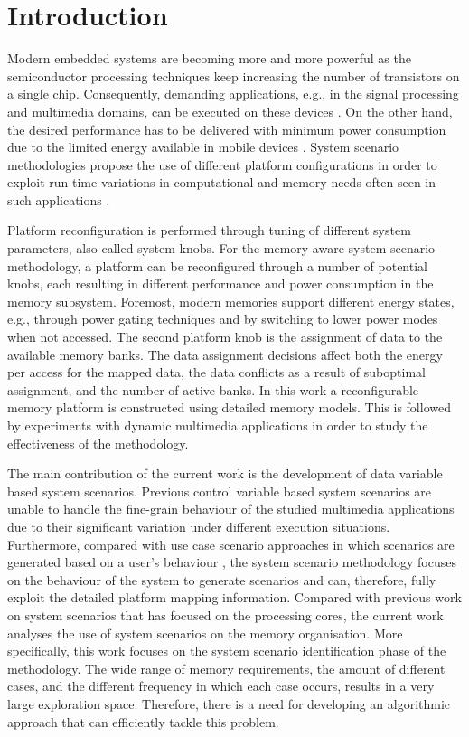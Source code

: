 \section{Introduction}
\label{sec:introductionC}

Modern embedded systems are becoming more and more powerful as the semiconductor processing techniques keep increasing the number of transistors on a single chip. 
Consequently, demanding applications, e.g., in the signal processing and multimedia domains, can be executed on these devices \cite{narasinga}. 
On the other hand, the desired performance has to be delivered with minimum power consumption due to the limited energy available in mobile devices \cite{tcm}. 
System scenario methodologies propose the use of different platform configurations in order to exploit run-time variations in computational and memory needs often seen in such applications \cite{tcm}.

Platform reconfiguration is performed through tuning of different system parameters, also called system knobs. 
For the memory-aware system scenario methodology, a platform can be reconfigured through a number of potential knobs, each resulting in different performance and power consumption in the memory subsystem. 
Foremost, modern memories support different energy states, e.g., through power gating techniques and by switching to lower power modes when not accessed. 
The second platform knob is the assignment of data to the available memory banks.
The data assignment decisions affect both the energy per access for the mapped data, the data conflicts as a result of suboptimal assignment, and the number of active banks. 
In this work a reconfigurable memory platform is constructed using detailed memory models. 
This is followed by experiments with dynamic multimedia applications in order to study the effectiveness of the methodology.

The main contribution of the current work is the development of data variable \cite{Elena2012} based system scenarios.
Previous control variable based system scenarios \cite{Gheorghita2007} are unable to handle the fine-grain behaviour of the studied multimedia applications due to their significant variation under different execution situations. 
Furthermore, compared with use case scenario approaches in which scenarios are generated based on a user's behaviour \cite{usecase}, the system scenario methodology focuses on the behaviour of the system to generate scenarios and can, therefore, fully exploit the detailed platform mapping information. 
Compared with previous work on system scenarios that has focused on the processing cores, the current work analyses the use of system scenarios on the memory organisation. 
More specifically, this work focuses on the system scenario identification phase of the methodology.
The wide range of memory requirements, the amount of different cases, and the different frequency in which each case occurs, results in a very large exploration space.
Therefore, there is a need for developing an algorithmic approach that can efficiently tackle this problem.

